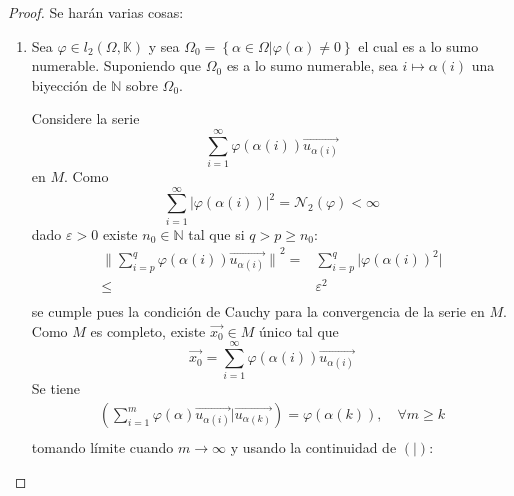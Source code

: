 \documentclass[12pt]{report}
\theoremstyle{largebreak}
\newcommand\abs[1]{\ensuremath{\big|#1\big|}}
\newcommand\norm[1]{\ensuremath{\|#1\|}}
\newcommand\pint[2]{\ensuremath{\left(#1\big| #2\right)}}
\begin{document}
    \begin{proof}
        Se harán varias cosas:
        \begin{enumerate}
            \item Sea $\varphi\in l_2(\Omega,\mathbb{K})$ y sea $\Omega_0=\left\{\alpha\in\Omega\Big|\varphi(\alpha)\neq0 \right\}$ el cual es a lo sumo numerable. Suponiendo que $\Omega_0$ es a lo sumo numerable, sea $i\mapsto\alpha(i)$ una biyección de $\mathbb{N}$ sobre $\Omega_0$.
            
            Considere la serie
            \begin{equation*}
                \sum_{i=1} ^{\infty}\varphi(\alpha(i))\vec{u_{\alpha(i)}}
            \end{equation*}
            en $M$. Como
            \begin{equation*}
                \sum_{i=1}^{\infty}\abs{\varphi(\alpha(i))}^2=\mathcal{N}_2(\varphi)<\infty
            \end{equation*}
            dado $\varepsilon>0$ existe $n_0\in\mathbb{N}$ tal que si $q>p\geq n_0$:
            \begin{equation*}
                \begin{split}
                    \norm{\sum_{i=p }^{q}\varphi(\alpha(i))\vec{u_{\alpha(i)}}}^2=&\sum_{i=p }^{q}\abs{\varphi(\alpha(i))^2}\\
                    \leq&\varepsilon^2 \\
                \end{split}
            \end{equation*}
            se cumple pues la condición de Cauchy para la convergencia de la serie en $M$. Como $M$ es completo, existe $\vec{x_0}\in M$ único tal que
            \begin{equation*}
                \vec{x_0}=\sum_{i=1} ^{\infty}\varphi(\alpha(i))\vec{u_{\alpha(i)}}
            \end{equation*}
            Se tiene
            \begin{equation*}
                \begin{split}
                    \pint{\sum_{i=1 }^{m}\varphi(\alpha)\vec{u_{\alpha(i)}}}{\vec{u_{\alpha(k)}}}=\varphi(\alpha(k)),\quad\forall m\geq k \\
                \end{split}
            \end{equation*}
            tomando límite cuando $m\rightarrow\infty$ y usando la continuidad de $\pint{}{}$:
            \begin{equation*}

\end{equation*}
\end{enumerate}
\end{proof}
\end{document}
